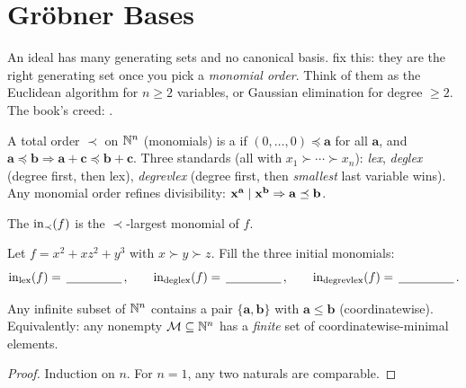\section{Gröbner Bases}\label{sec:groebner}
\quad{}

\begin{strand}
An ideal has many generating sets and no canonical basis.  fix this:
they are the right generating set once you pick a \emph{monomial order}. Think of them as the
Euclidean algorithm for $n\ge2$ variables, or Gaussian elimination for degree $\ge2$. The book's
creed: .
\end{strand}


\begin{definition}\label{def:order}
A total order $\prec$ on $\N^n$ (monomials) is a  if
$(0,\dots,0)\preceq\mathbf a$ for all $\mathbf a$, and $\mathbf a\preceq\mathbf b\Rightarrow
\mathbf a+\mathbf c\preceq\mathbf b+\mathbf c$. Three standards (all with $x_1\succ\cdots\succ x_n$):
\emph{lex}, \emph{deglex} (degree first, then lex), \emph{degrevlex} (degree first, then
\emph{smallest} last variable wins). Any monomial order refines divisibility:
$\xb^{\mathbf a}\mid\xb^{\mathbf b}\Rightarrow\mathbf a\preceq\mathbf b$.
\end{definition}

The  $\inn_\prec(f)$ is the $\prec$-largest monomial of $f$.

\begin{yourturn}
Let $f=x^2+xz^2+y^3$ with $x\succ y\succ z$. Fill the three initial monomials:
\[
  \inn_{\mathrm{lex}}(f)=\fillin[1.6cm],\qquad
  \inn_{\mathrm{deglex}}(f)=\fillin[1.6cm],\qquad
  \inn_{\mathrm{degrevlex}}(f)=\fillin[1.6cm].
\]
\end{yourturn}


\begin{theorem}\label{thm:dickson}
Any infinite subset of $\N^n$ contains a pair $\{\mathbf a,\mathbf b\}$ with $\mathbf a\le\mathbf b$
(coordinatewise). Equivalently: any nonempty $\mathcal M\subseteq\N^n$ has a \emph{finite} set of
coordinatewise-minimal elements.
\end{theorem}
\begin{proof}
Induction on $n$. For $n=1$, any two naturals are comparable. 
\end{proof}

